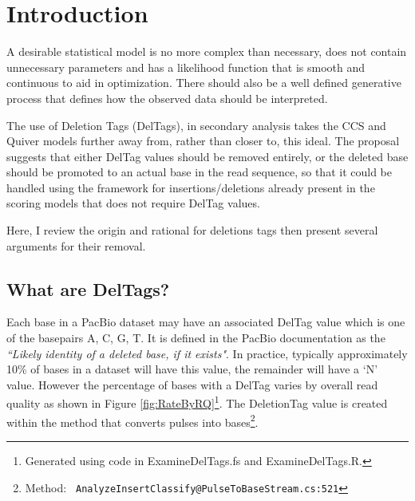 \documentclass[fleqn,10pt]{SelfArx} %
\begin{document}
\flushbottom %

\maketitle %

\tableofcontents %

\thispagestyle{empty} %


\section*{Introduction} %


A desirable statistical model is no more complex than necessary, does not contain unnecessary parameters and has a likelihood function that is smooth and continuous to aid in optimization.  There should also be a well defined generative process that defines how the observed data should be interpreted.

The use of Deletion Tags (DelTags), in secondary analysis takes the CCS and Quiver models further away from, rather than closer to, this ideal.  The proposal suggests that either DelTag values should be removed entirely, or the deleted base should be promoted to an actual base in the read sequence, so that it could be handled using the framework for insertions/deletions already present in the scoring models that does not require DelTag values. 

Here, I review the origin and rational for deletions tags then present several arguments for their removal. 



\subsection{What are DelTags?}
Each base in a PacBio dataset may have an associated DelTag value which is one of the basepairs A, C, G, T.  It is defined in the PacBio documentation as the \textit{``Likely identity of a deleted base, if it exists"}.  In practice, typically approximately 10\% of bases in a dataset will have this value, the remainder will have a `N' value.  However the percentage of bases with a DelTag varies by overall read quality as shown in Figure \ref{fig:RateByRQ}\footnote{Generated using code in ExamineDelTags.fs and ExamineDelTags.R.}.  The DeletionTag value is created within the method that converts pulses into bases\footnote{Method: \texttt{ AnalyzeInsertClassify@PulseToBaseStream.cs:521}}.
\end{document}
